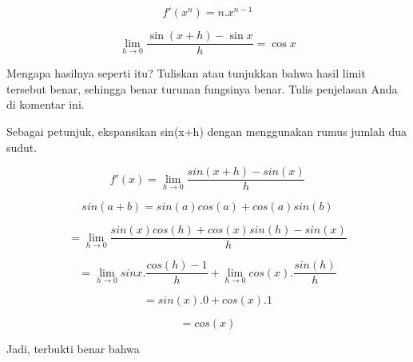 \documentclass{article}
\begin{document}
\begin{eulernotebook}
\begin{eulercomment}
\begin{eulercomment}
\begin{eulercomment}
\begin{eulercomment}
\begin{eulercomment}
\begin{eulercomment}
\begin{eulercomment}
\begin{eulercomment}
\begin{eulerformula}
\[
f'(x^n) = n.x^{n-1}
\]
\end{eulerformula}
\eulersubheading{}
\begin{eulerformula}
\[
\lim_{h\rightarrow 0}{\frac{\sin \left(x+h\right)-\sin x}{h}}=\cos 
 x
\]
\end{eulerformula}
\begin{eulercomment}
Mengapa hasilnya seperti itu? Tuliskan atau tunjukkan bahwa hasil
limit tersebut benar, sehingga benar turunan fungsinya benar. Tulis
penjelasan Anda di komentar ini. 

Sebagai petunjuk, ekspansikan sin(x+h) dengan menggunakan rumus jumlah
dua sudut.

\end{eulercomment}
\begin{eulercomment}
\end{eulercomment}
\begin{eulerformula}
\[
f'(x) = \lim_{h\to 0} \frac{sin(x+h)-sin(x)}{h}
\]
\end{eulerformula}
\begin{eulercomment}
\end{eulercomment}
\begin{eulerformula}
\[
sin(a+b)=sin(a)cos(a)+cos(a)sin(b)
\]
\end{eulerformula}
\begin{eulercomment}
\end{eulercomment}
\begin{eulerformula}
\[
= \lim_{h\to 0} \frac{sin(x)cos(h)+cos(x)sin(h)-sin(x)}{h}
\]
\end{eulerformula}
\begin{eulercomment}
\end{eulercomment}
\begin{eulerformula}
\[
= \lim_{h\to 0} sinx.\frac{cos(h)-1}{h}+\lim_{h\to 0} cos(x).\frac{sin(h)}{h}
\]
\end{eulerformula}
\begin{eulerformula}
\[
= sin(x).0+cos(x).1
\]
\end{eulerformula}
\begin{eulercomment}
\end{eulercomment}
\begin{eulerformula}
\[
= cos(x)
\]
\end{eulerformula}
\begin{eulercomment}
Jadi, terbukti benar bahwa


\end{eulercomment}
\end{eulercomment}
\end{eulercomment}
\end{eulercomment}
\end{eulercomment}
\end{eulercomment}
\end{eulercomment}
\end{eulercomment}
\end{eulercomment}
\end{eulernotebook}
\end{document}
